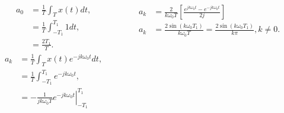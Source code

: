 \begin{frame}
    {
        \begin{columns}
          \begin{column}{0.5\textwidth}
                \begin{equation*}
                    \begin{split}
                       a_0 &= \frac{1}{T} \int_{T}x(t)dt,\\
                       &=  \frac{1}{T} \int_{-T_1}^{T_1}1dt,\\
                       &= \frac{2T_1}{T}.
                    \end{split}
                \end{equation*}
                \pause
                \begin{equation*}
                    \begin{split}
                       a_k &= \frac{1}{T} \int_{T}x(t)e^{-jk\omega_0 t}dt,\\
                       &=  \frac{1}{T} \int_{-T_1}^{T_1}e^{-jk\omega_0 t},\\
                       &= -\left. \frac{1}{jk\omega_0 T}e^{-jk\omega_0 t}\right|^{T_1}_{-T_1}
                    \end{split}
                \end{equation*}
          \end{column}
          \begin{column}{0.5\textwidth}
                \pause

                \pause

                \begin{equation*}
                    \begin{split}
                       a_k &= \frac{2}{k\omega_0 T}\left[\frac{e^{jk\omega_0 t} - e^{-jk\omega_0 t}}{2j}\right]\\
                       a_k &= \frac{2\sin(k\omega_0 T_1)}{k\omega_0 T} = \frac{2\sin(k\omega_0 T_1)}{k\pi}, k \neq 0.
                    \end{split}
                \end{equation*}
          \end{column}
        \end{columns}


    }
\end{frame}

